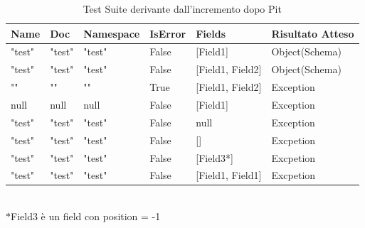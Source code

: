 \documentclass[12pt, a4paper]{article}
\begin{document}
\begin{table}[ht]
  \centering
  \caption[CreateRecord: Test Suite - Mutation Testing]{Test Suite derivante dall'incremento dopo Pit}
  \begin{tabular}{|l|l|l|l|l|l|}
    \hline
    \textbf{Name} & \textbf{Doc} & \textbf{Namespace}  & \textbf{IsError} & \textbf{Fields} & \textbf{Risultato Atteso} \\
    \hline
    "test" & "test" & "test" & False & [Field1] & Object(Schema) \\
    "test" & "test" & "test" & False & [Field1, Field2] & Object(Schema) \\
    "" & "" & "" & True & [Field1, Field2] & Exception \\
    null & null & null & False & [Field1] & Exception \\
    "test" & "test" & "test" & False & null & Exception \\
    "test" & "test" & "test" & False & [] & Excpetion \\
    "test" & "test" & "test" & False & [Field3*] & Excpetion \\
    "test" & "test" & "test" & False & [Field1, Field1] & Excpetion \\
    \hline
  \end{tabular}
   \\$\ast$Field3 è un field con position = -1
  \label{tab:PitCreateRecord1}
\end{table}
  

\end{document}
